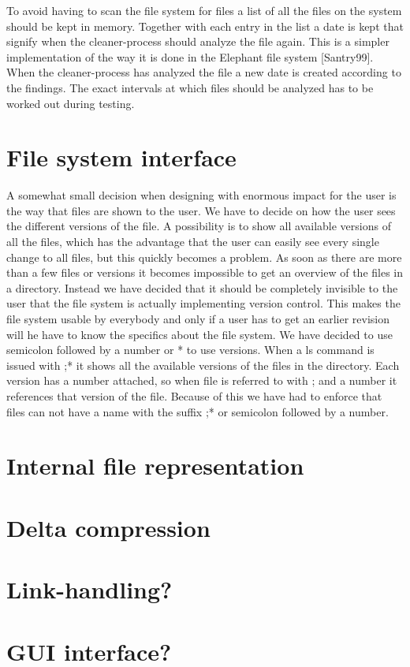 \documentclass[12pt]{article}
\begin{document}
To avoid having to scan the file system for files a list of all the
files on the system should be kept in memory. Together with each entry
in the list a date is kept that signify when the cleaner-process
should analyze the file again. This is a simpler implementation of the
way it is done in the Elephant file system [Santry99]. When the
cleaner-process has analyzed the file a new date is created according
to the findings. The exact intervals at which files should be analyzed
has to be worked out during testing.

\section{File system interface}

A somewhat small decision when designing with enormous impact for the
user is the way that files are shown to the user.
We have to decide on how the user sees the different versions of the
file. A possibility is to show all available versions of all the
files,
which has the advantage that the user can easily see every single
change to all files, but this quickly becomes a problem.
As soon as there are more than a few files or versions it becomes
impossible to get an overview of the files in a directory.
Instead we have decided that it should be completely invisible to the
user that the file system is actually implementing version control.
This makes the file system usable by everybody and only if a user has
to get an earlier revision will he have to know the specifics about
the file system.
We have decided to use semicolon followed by a number or * to use
versions.
When a ls command is issued with ;* it shows all the available
versions of the files in the directory.
Each version has a number attached, so when file is referred to with ;
and a number it references that version of the file.
Because of this we have had to enforce that files can not have a name
with the suffix ;* or semicolon followed by a number.

\section{Internal file representation}

\section{Delta compression}

\section{Link-handling?}

\section{GUI interface?}




 
\end{document}
